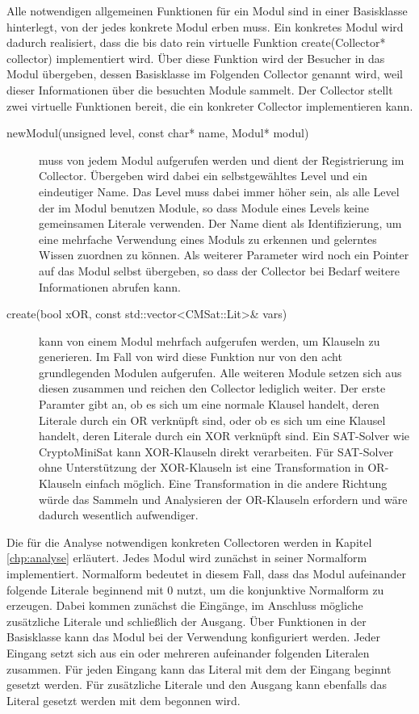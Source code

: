 Alle notwendigen allgemeinen Funktionen für ein Modul sind in einer Basisklasse hinterlegt, von der jedes konkrete Modul erben muss. Ein konkretes Modul wird
dadurch realisiert, dass die bis dato rein virtuelle Funktion create(Collector* collector) implementiert wird. Über diese Funktion wird der Besucher in das Modul
übergeben, dessen Basisklasse im Folgenden Collector genannt wird, weil dieser Informationen über die besuchten Module sammelt. Der Collector stellt zwei virtuelle
Funktionen bereit, die ein konkreter Collector implementieren kann.
\begin{description}
  \item[newModul(unsigned level, const char* name, Modul* modul)] muss von jedem Modul aufgerufen werden und dient der Registrierung im Collector.
       Übergeben wird dabei ein selbstgewähltes Level und ein eindeutiger Name. Das Level muss dabei immer höher sein, als alle Level der im Modul
       benutzen Module, so dass Module eines Levels keine gemeinsamen Literale verwenden. Der Name dient als Identifizierung, um eine mehrfache
       Verwendung eines Moduls zu erkennen und gelerntes Wissen zuordnen zu können. Als weiterer Parameter wird noch ein Pointer auf das Modul
       selbst übergeben, so dass der Collector bei Bedarf weitere Informationen abrufen kann.
  \item[create(bool xOR, const std::vector<CMSat::Lit>\& vars)] kann von einem Modul mehrfach aufgerufen werden, um Klauseln zu generieren.
       Im Fall von  wird diese Funktion nur von den acht grundlegenden Modulen aufgerufen. Alle weiteren Module setzen sich aus
       diesen zusammen und reichen den Collector lediglich weiter. Der erste Paramter gibt an, ob es sich um eine normale Klausel handelt,
       deren Literale durch ein OR verknüpft sind, oder ob es sich um eine Klausel handelt, deren Literale durch ein XOR verknüpft sind.
       Ein SAT-Solver wie CryptoMiniSat kann XOR-Klauseln direkt verarbeiten. Für SAT-Solver ohne Unterstützung der XOR-Klauseln ist eine
       Transformation in OR-Klauseln einfach möglich. Eine Transformation in die andere Richtung würde das Sammeln und Analysieren der
       OR-Klauseln erfordern und wäre dadurch wesentlich aufwendiger.
\end{description}
Die für die Analyse notwendigen konkreten Collectoren werden in Kapitel \ref{chp:analyse} erläutert. Jedes Modul wird zunächst in seiner Normalform implementiert.
Normalform bedeutet in diesem Fall, dass das Modul aufeinander folgende Literale beginnend mit $0$ nutzt, um die konjunktive Normalform zu erzeugen.
Dabei kommen zunächst die Eingänge, im Anschluss mögliche zusätzliche Literale und schließlich der Ausgang. Über Funktionen in der Basisklasse kann
das Modul bei der Verwendung konfiguriert werden. Jeder Eingang setzt sich aus ein oder mehreren aufeinander folgenden Literalen zusammen. Für jeden Eingang
kann das Literal mit dem der Eingang beginnt gesetzt werden. Für zusätzliche Literale und den Ausgang kann ebenfalls das Literal gesetzt werden mit dem begonnen wird.

